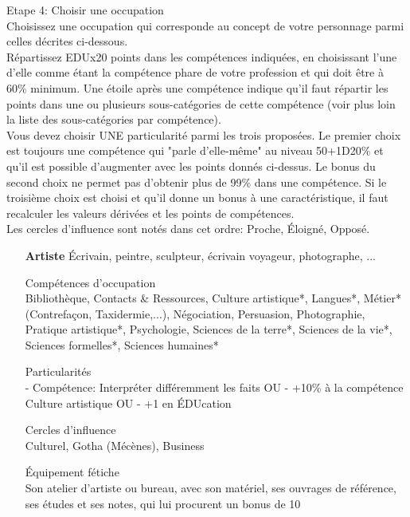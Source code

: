 \documentclass[11pt,twoside,a4paper]{article}
\begin{document}
\begin{multicols*}{2}
Etape 4: Choisir une occupation~\\
	Choisissez une occupation qui corresponde au concept de votre personnage parmi celles d{\'e}crites ci-dessous.~\\

	R{\'e}partissez EDUx20 points dans les comp{\'e}tences indiqu{\'e}es, en choisissant l'une d'elle comme {\'e}tant la comp{\'e}tence phare de votre profession et qui doit {\^e}tre {\`a} 60\% minimum. Une {\'e}toile apr{\`e}s une comp{\'e}tence indique qu'il faut r{\'e}partir les points dans une ou plusieurs sous-cat{\'e}gories de cette comp{\'e}tence (voir plus loin la liste des sous-cat{\'e}gories par comp{\'e}tence).~\\
	Vous devez choisir UNE particularit{\'e} parmi les trois propos{\'e}es. Le premier choix est toujours une comp{\'e}tence qui "parle d'elle-m{\^e}me" au niveau 50+1D20\% et qu'il est possible d'augmenter avec les points donn{\'e}s ci-dessus. Le bonus du second choix ne permet pas d'obtenir plus de 99\% dans une comp{\'e}tence. Si le troisi{\`e}me choix est choisi et qu'il donne un bonus {\`a} une caract{\'e}ristique, il faut recalculer les valeurs d{\'e}riv{\'e}es et les points de comp{\'e}tences.~\\
	Les cercles d'influence sont not{\'e}s dans cet ordre: Proche, {\'E}loign{\'e}, Oppos{\'e}.~\\

\vfill	
\columnbreak
	
\begin{itemize}

	\item[\textbf{Artiste}] {\'E}crivain, peintre, sculpteur, {\'e}crivain voyageur, photographe, ...
	
	Comp{\'e}tences d'occupation~\\
	Biblioth{\`e}que, Contacts \& Ressources, Culture artistique*, Langues*, M{\'e}tier* (Contrefa\c{c}on, Taxidermie,...), N{\'e}gociation, Persuasion, Photographie, Pratique artistique*, Psychologie, Sciences de la terre*, Sciences de la vie*, Sciences formelles*, Sciences humaines*
	
	Particularit{\'e}s~\\
	- Comp{\'e}tence: Interpr{\'e}ter diff{\'e}remment les faits OU
	- +10\% {\`a} la comp{\'e}tence Culture artistique OU
	- +1 en {\'E}DUcation
	
	Cercles d'influence~\\
	Culturel, Gotha (M{\'e}c{\`e}nes), Business
	
	{\'E}quipement f{\'e}tiche~\\
	Son atelier d'artiste ou bureau, avec son mat{\'e}riel, ses ouvrages de r{\'e}f{\'e}rence, ses {\'e}tudes et ses notes, qui lui procurent un bonus de 10%
	

\end{itemize}
\end{multicols*}
\end{document}
